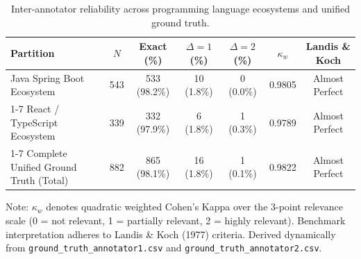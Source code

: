 \begin{table}[t]
\caption{Inter-annotator reliability across programming language ecosystems and unified ground truth.}
\label{tab:inter_annotator_agreement}
\centering\footnotesize
\setlength{\tabcolsep}{8pt}
\begin{threeparttable}
\begin{tabular}{@{}lcccccc@{}}
\toprule
Partition & $N$ & Exact (\%) & $\Delta = 1$ (\%) & $\Delta = 2$ (\%) & $\kappa_w$ & Landis \& Koch \\
\midrule
Java Spring Boot Ecosystem & 543 & 533 (98.2\%) & 10 (1.8\%) & 0 (0.0\%) & 0.9805 & Almost Perfect \\
\cmidrule(lr){1-7}
React / TypeScript Ecosystem & 339 & 332 (97.9\%) & 6 (1.8\%) & 1 (0.3\%) & 0.9789 & Almost Perfect \\
\cmidrule(lr){1-7}
Complete Unified Ground Truth (Total) & 882 & 865 (98.1\%) & 16 (1.8\%) & 1 (0.1\%) & 0.9822 & Almost Perfect \\
\bottomrule
\end{tabular}
\begin{tablenotes}\footnotesize
\item[] Note: $\kappa_w$ denotes quadratic weighted Cohen's Kappa over the 3-point relevance scale (0 = not relevant, 1 = partially relevant, 2 = highly relevant). Benchmark interpretation adheres to Landis \& Koch (1977) criteria. Derived dynamically from \texttt{ground\_truth\_annotator1.csv} and \texttt{ground\_truth\_annotator2.csv}.
\end{tablenotes}
\end{threeparttable}
\end{table}
